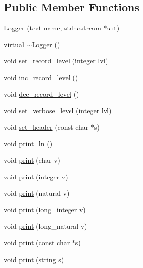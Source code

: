 \subsection*{Public Member Functions}
\begin{DoxyCompactItemize}
\item 
\hyperlink{classez_1_1logging_1_1Logger_ac9465bcd94c08532b30b1801d71fbd19}{Logger} (text name, std\+::ostream $\ast$out)
\item 
virtual \hyperlink{classez_1_1logging_1_1Logger_acb668a9e186a25fbaad2e4af6d1ed00a}{$\sim$\+Logger} ()
\item 
void \hyperlink{classez_1_1logging_1_1Logger_a64bfdfc5a20a7ee660144c50dfd0514e}{set\+\_\+record\+\_\+level} (integer lvl)
\item 
void \hyperlink{classez_1_1logging_1_1Logger_a9f9bf63329c39c8f9fb116faba1a9b1e}{inc\+\_\+record\+\_\+level} ()
\item 
void \hyperlink{classez_1_1logging_1_1Logger_a337c7162a46c5e7374e80b7166cc869f}{dec\+\_\+record\+\_\+level} ()
\item 
void \hyperlink{classez_1_1logging_1_1Logger_ae9fd25392d4dc7611acafd335bfe5f94}{set\+\_\+verbose\+\_\+level} (integer lvl)
\item 
void \hyperlink{classez_1_1logging_1_1Logger_a2845727c27243d47fefbd9d65df5bd6b}{set\+\_\+header} (const char $\ast$s)
\item 
void \hyperlink{classez_1_1logging_1_1Logger_ab8e5b19223eca4b3af5ff7df2db607b7}{print\+\_\+ln} ()
\item 
void \hyperlink{classez_1_1logging_1_1Logger_a74db3d434d837a1fcdeb5a6c2326eeb3}{print} (char v)
\item 
void \hyperlink{classez_1_1logging_1_1Logger_a85f93d25c8f5eebe65b81cb72ebaea3e}{print} (integer v)
\item 
void \hyperlink{classez_1_1logging_1_1Logger_aeb154caf1a7b122fea39eb9bf6f5079a}{print} (natural v)
\item 
void \hyperlink{classez_1_1logging_1_1Logger_a20758ba23aea43e022c3198b85b8c0ed}{print} (long\+\_\+integer v)
\item 
void \hyperlink{classez_1_1logging_1_1Logger_a8c1b7b0e80f11d4b74362294fe968072}{print} (long\+\_\+natural v)
\item 
void \hyperlink{classez_1_1logging_1_1Logger_ae8367292df1035d9bc7bd09fd5ca35a7}{print} (const char $\ast$s)
\item 
void \hyperlink{classez_1_1logging_1_1Logger_a9be560bcbe68f5262eb7bd019bb8775b}{print} (string s)
\item 

\end{DoxyCompactItemize}
